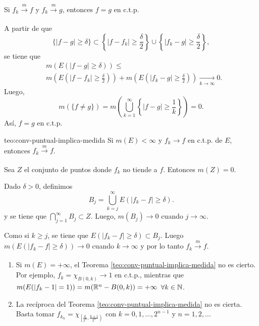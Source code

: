 \begin{teorema}{}
Si $f_k \xrightarrow[]{m}f$ y $f_k \xrightarrow[]{m} g$, entonces
$f=g$ en c.t.p.
\end{teorema}

\begin{demo}
A partir de que 
\[
\{|f-g|\geq \delta\} \subset 
\left\{|f-f_k|\geq\frac{\delta}{2}\right\} \cup \left\{|f_k-g|\geq\frac{\delta}{2}\right\}, 
\]
se tiene que 
\[
\begin{split}
&m\left(E\left(|f-g|\geq \delta\right)\right)\leq 
\\
&m\left(E\left(|f-f_k|\geq \frac{\delta}{2}\right)\right)+
m\left(E\left(|f_k-g|\geq \frac{\delta}{2}\right)\right) \xrightarrow[k \to \infty]{} 0.
\end{split}
\]
Luego, 
\[
m(\{f\neq g\})=
m\left( \bigcup\limits_{k=1}^{\infty} \left\{|f-g|\geq \frac{1}{k}  \right\} \right)=0.
\]
As\'i, $f=g$ en c.t.p.
\end{demo}


\begin{teorema}{teo:conv-puntual-implica-medida}
Si $m(E)<\infty$ y $f_k \to f$ en c.t.p. de $E$, entonces 
$f_k \xrightarrow[]{m}f$.
\end{teorema}


\begin{demo}
Sea $Z$ el conjunto de puntos donde $f_k$ no tiende a $f$. Entonces $m(Z)=0$. 

Dado $\delta>0$, definimos 
\[
B_j=\bigcup\limits_{k=j}^{\infty} E(|f_k-f|\geq \delta).
\]
 y se tiene que $ \bigcap\limits_{j=1}^{\infty} B_j\subset Z.$
 Luego, $m(B_j)\to 0$ cuando $j \to \infty$.
 
 Como si $k \geq j$, se tiene que $E(|f_k-f|\geq \delta )\subset B_j$.
Luego $m(E(|f_k-f|\geq \delta))\to 0$ cuando $k \to \infty$
y por lo tanto $f_k \xrightarrow[]{m}f.$
\end{demo}

\begin{observacion}{}
\begin{enumerate}
    \item Si $m(E)=+\infty$, el Teorema \ref{teo:conv-puntual-implica-medida} no es cierto. 
    Por ejemplo,  $f_k=\chi_{B(0,k)} \to 1$ en c.t.p., mientras que 
    $m(E(|f_k-1|=1 ))=m(\mathbb{R}^n-B(0,k))= +\infty$\; $\forall k\in \mathbb{N}$.
    \item La rec\'iproca del Teorema \ref{teo:conv-puntual-implica-medida} no es cierta. 
    Basta tomar $f_{k_n}=\chi_{\left[\frac{k}{2^n}, \frac{k+1}{2^n}\right)}$ con 
    $k=0,1, \ldots, 2^{n-1}$ y $n=1,2,\ldots$
\end{enumerate}
\end{observacion}{}

